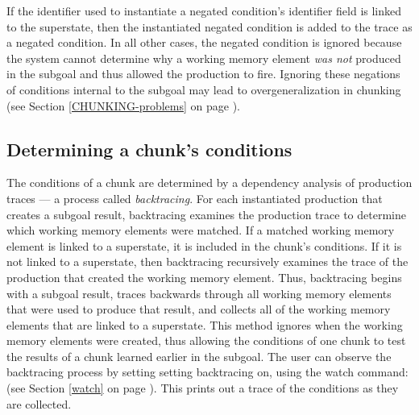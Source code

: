 If the identifier used to instantiate a negated condition's identifier field
is linked to the superstate, then the instantiated negated condition is
added to the trace as a negated condition. In all other cases, the negated
condition is ignored because the system cannot determine why a working memory
element \emph{was not} produced in the subgoal and thus allowed the production
to fire. Ignoring these negations of conditions internal to the subgoal may
lead to overgeneralization in chunking (see Section \ref{CHUNKING-problems} on
page \pageref{CHUNKING-problems}). 
     
\subsection{Determining a chunk's conditions}

The conditions of a chunk are determined by a dependency analysis of
production traces --- a process called \emph{backtracing}.  For each
instantiated production that creates a subgoal result, backtracing examines
the production trace to determine which working memory elements were matched.
If a matched working memory element is linked to a superstate, it is included
in the chunk's conditions. If it is not linked to a superstate, then
backtracing recursively examines the trace of the production that created the
working memory element. Thus, backtracing begins with a subgoal result, traces
backwards through all working memory elements that were used to produce that
result, and collects all of the working memory elements that are linked to a
superstate. This method ignores when the working memory elements were created,
thus allowing the conditions of one chunk to test the results of a chunk
learned earlier in the subgoal. The user can observe the backtracing process
by setting setting backtracing on, using the watch command:  (see Section \ref{watch} on page \pageref{watch}). 
This prints out a trace of the conditions as they are collected.

